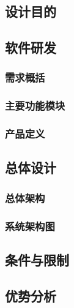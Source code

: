 \subsection{设计目的}

\subsection{软件研发}

\subsubsection*{需求概括}

\subsubsection*{主要功能模块}

\subsubsection*{产品定义}

\subsection{总体设计}

\subsubsection*{总体架构}

\subsubsection*{系统架构图}
\subsection{条件与限制}

\subsection{优势分析}
